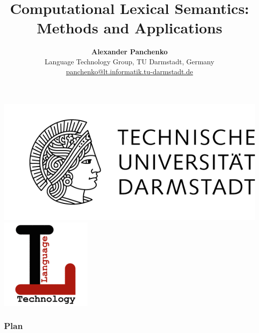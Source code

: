 \documentclass{beamer}
\title[\insertframenumber/\inserttotalframenumber]
{\textbf{Computational Lexical Semantics: \\ Methods and Applications }}
\subtitle{}
\author[Alexander Panchenko]
{\textbf{Alexander Panchenko} \\ Language Technology Group, TU Darmstadt, Germany   \\ { \url{panchenko@lt.informatik.tu-darmstadt.de}  }}
\begin{document}
\begin{frame}
  \titlepage
  \vspace{-0.7cm}
  \begin{center}
    \includegraphics[width=.32\textwidth]{figures/tu} 
    \includegraphics[width=.12\textwidth]{figures/lt} 
    
   \end{center}
  
\end{frame}

\begin{frame}
  \setcounter{tocdepth}{1}
  \frametitle{Plan}
  \tableofcontents
  \setcounter{tocdepth}{2}
\end{frame}




%
%

%



%
%
%
%
\end{document}
